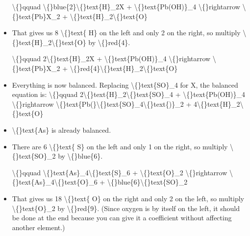 \documentclass{article}
\begin{document}
\begin{itemize}
                    \textbackslash\{\}qquad
                        \textbackslash\{\}blue\{2\}\textbackslash\{\}text\{H\}\_2X + \textbackslash\{\}text\{Pb(OH)\}\_4 \textbackslash\{\}rightarrow \textbackslash\{\}text\{Pb\}X\_2 + \textbackslash\{\}text\{H\}\_2\textbackslash\{\}text\{O\}
  \item That gives us 8 \textbackslash\{\}text\{ H\} on the left and
                        only 2 on the right, so multiply
                        \textbackslash\{\}text\{H\}\_2\textbackslash\{\}text\{O\} by \textbackslash\{\}red\{4\}.
                    
                    \textbackslash\{\}qquad
                        2\textbackslash\{\}text\{H\}\_2X + \textbackslash\{\}text\{Pb(OH)\}\_4 \textbackslash\{\}rightarrow \textbackslash\{\}text\{Pb\}X\_2 + \textbackslash\{\}red\{4\}\textbackslash\{\}text\{H\}\_2\textbackslash\{\}text\{O\}
  \item Everything is now balanced. Replacing \textbackslash\{\}text\{SO\}\_4 for X, the balanced equation is:
                    \textbackslash\{\}qquad
                        2\textbackslash\{\}text\{H\}\_2\textbackslash\{\}text\{SO\}\_4 + \textbackslash\{\}text\{Pb(OH)\}\_4 \textbackslash\{\}rightarrow \textbackslash\{\}text\{Pb(\}\textbackslash\{\}text\{SO\}\_4\textbackslash\{\}text\{)\}\_2 + 4\textbackslash\{\}text\{H\}\_2\textbackslash\{\}text\{O\}
  \item \textbackslash\{\}text\{As\} is already balanced.
  \item There are 6 \textbackslash\{\}text\{ S\} on the left and
                        only 1 on the right, so multiply
                        \textbackslash\{\}text\{SO\}\_2 by \textbackslash\{\}blue\{6\}.
                    
                    \textbackslash\{\}qquad
                        \textbackslash\{\}text\{As\}\_4\textbackslash\{\}text\{S\}\_6 + \textbackslash\{\}text\{O\}\_2 \textbackslash\{\}rightarrow \textbackslash\{\}text\{As\}\_4\textbackslash\{\}text\{O\}\_6 + \textbackslash\{\}blue\{6\}\textbackslash\{\}text\{SO\}\_2
  \item That gives us 18 \textbackslash\{\}text\{ O\} on the right and
                        only 2 on the left, so multiply
                        \textbackslash\{\}text\{O\}\_2 by \textbackslash\{\}red\{9\}.
                        (Since oxygen is by itself on the left, it should be done
                        at the end because you can give it a coefficient without
                        affecting another element.)
                    

\end{itemize}
\end{document}
